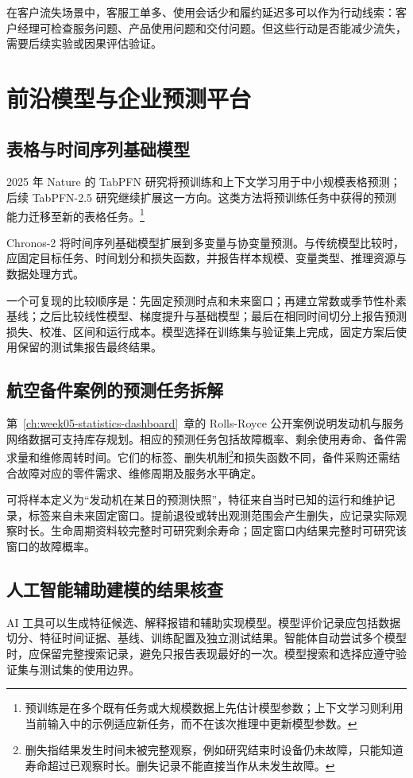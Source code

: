 在客户流失场景中，客服工单多、使用会话少和履约延迟多可以作为行动线索：客户经理可检查服务问题、产品使用问题和交付问题。但这些行动是否能减少流失，需要后续实验或因果评估验证。

\section{前沿模型与企业预测平台}

\subsection{表格与时间序列基础模型}
2025 年 Nature 的 TabPFN 研究将预训练和上下文学习用于中小规模表格预测；后续 TabPFN-2.5 研究继续扩展这一方向\cite{tabpfn07,tabpfn25}。这类方法将预训练任务中获得的预测能力迁移至新的表格任务。\footnote{预训练是在多个既有任务或大规模数据上先估计模型参数；上下文学习则利用当前输入中的示例适应新任务，而不在该次推理中更新模型参数。}

Chronos-2 将时间序列基础模型扩展到多变量与协变量预测\cite{chronos07}。与传统模型比较时，应固定目标任务、时间划分和损失函数，并报告样本规模、变量类型、推理资源与数据处理方式。

一个可复现的比较顺序是：先固定预测时点和未来窗口；再建立常数或季节性朴素基线；之后比较线性模型、梯度提升与基础模型；最后在相同时间切分上报告预测损失、校准、区间和运行成本。模型选择在训练集与验证集上完成，固定方案后使用保留的测试集报告最终结果。

\subsection{航空备件案例的预测任务拆解}
第~\ref{ch:week05-statistics-dashboard}~章的 Rolls-Royce 公开案例说明发动机与服务网络数据可支持库存规划。相应的预测任务包括故障概率、剩余使用寿命、备件需求量和维修周转时间。它们的标签、删失机制\footnote{删失指结果发生时间未被完整观察，例如研究结束时设备仍未故障，只能知道寿命超过已观察时长。删失记录不能直接当作从未发生故障。}和损失函数不同，备件采购还需结合故障对应的零件需求、维修周期及服务水平确定。

可将样本定义为“发动机在某日的预测快照”，特征来自当时已知的运行和维护记录，标签来自未来固定窗口。提前退役或转出观测范围会产生删失，应记录实际观察时长。生命周期资料较完整时可研究剩余寿命；固定窗口内结果完整时可研究该窗口的故障概率。

\subsection{人工智能辅助建模的结果核查}
AI 工具可以生成特征候选、解释报错和辅助实现模型。模型评价记录应包括数据切分、特征时间证据、基线、训练配置及独立测试结果。智能体自动尝试多个模型时，应保留完整搜索记录，避免只报告表现最好的一次。模型搜索和选择应遵守验证集与测试集的使用边界。

